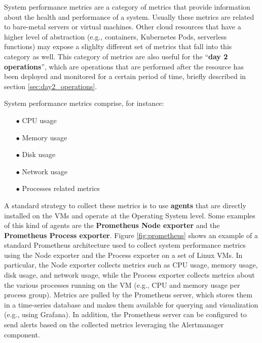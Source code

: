System performance metrics are a category of metrics that provide information about the health and performance of a system.
Usually these metrics are related to bare-metal servers or virtual machines.
Other cloud resources that have a higher level of abstraction (e.g., containers, Kubernetes Pods, serverless functions) may expose a slighlty different set of metrics that fall into this category as well.
This category of metrics are also useful for the ``\textbf{day 2 operations}'', which are operations that are performed after the resource has been deployed and monitored for a certain period of time, briefly described in section \ref{sec:day2_operations}.

System performance metrics comprise, for instance:
\begin{itemize}[itemsep=0.2pt, topsep=1pt]
  \item[$\bullet$] CPU usage
  \item[$\bullet$] Memory usage
  \item[$\bullet$] Disk usage
  \item[$\bullet$] Network usage
  \item[$\bullet$] Processes related metrics \\
\end{itemize}

A standard strategy to collect these metrics is to use \textbf{agents} that are directly installed on the VMs and operate at the Operating System level.
Some examples of this kind of agents are the \textbf{Prometheus Node exporter} and the \textbf{Prometheus Process exporter}.
Figure \ref{fig:prometheus} shows an example of a standard Prometheus architecture used to collect system performance metrics using the Node exporter and the Process exporter on a set of Linux VMs.
In particular, the Node exporter collects metrics such as CPU usage, memory usage, disk usage, and network usage, while the Process exporter collects metrics about the various processes running on the VM (e.g., CPU and memory usage per process group).
Metrics are pulled by the Prometheus server, which stores them in a time-series database and makes them available for querying and visualization (e.g., using Grafana). 
In addition, the Prometheus server can be configured to send alerts based on the collected metrics leveraging the Alertmanager component. \newline

